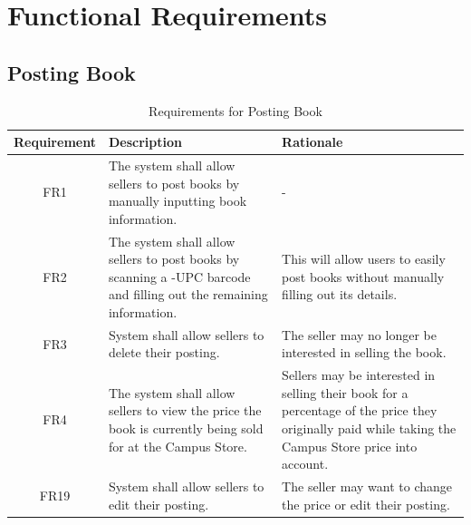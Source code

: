 \documentclass[fullpage]{article}
\begin{document}
\section{Functional Requirements}

\subsection{Posting Book}
\begin{table}[h!]
\flushleft
\begin{tabular}{|c|p{6cm}|p{6cm}|}
\hline
 \rowcolor{lightgray}
\textbf{Requirement} & \textbf{Description} & \textbf{Rationale} \\
\hline
FR1 &The system shall allow sellers to post books by manually inputting book information.& -\\
\hline
FR2&The system shall allow sellers to post books by scanning a -UPC barcode and filling out the remaining information. & This will allow users to easily post books without manually filling out its details.\\
\hline
FR3 & System shall allow sellers to delete their posting.& The seller may no longer be interested in selling the book.\\
\hline
FR4 &  The system shall allow sellers to view the price the book is currently being sold for at the Campus Store. & Sellers may be interested in selling their book for a percentage of the price they originally paid while taking the Campus Store price into account.\\
\hline
FR19 & System shall allow sellers to edit their posting.& The seller may want to change the price or edit their posting.\\
\hline
\hline
\end{tabular}
\caption{Requirements for Posting Book}
\end{table}
\newpage
\end{document}
